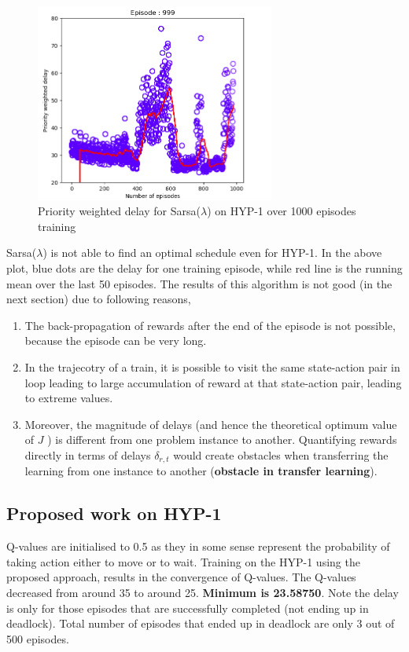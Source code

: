 \begin{figure}[h]
    \centering
    \includegraphics[width=0.7\textwidth]{Sarsa_HYP-1}
    \caption{ Priority weighted delay for Sarsa($\lambda$) on HYP-1 over 1000 episodes training}
    \label{Sarsa_HYP-1}
\end{figure}

Sarsa($\lambda$) is not able to find an optimal schedule even for HYP-1. In the above plot, 
blue dots are the delay for one training episode, while red line is the running mean over the 
last 50 episodes.
The results of this algorithm is not good (in the next section) due to following reasons,
\begin{enumerate}
\item The back-propagation of rewards
      after the end of the episode is not possible, because the episode
can be very long.
\item In the trajecotry of a train, it is possible to visit the same state-action pair in loop leading to 
large accumulation of reward at that state-action pair, leading to extreme values.
\item Moreover, the magnitude of delays (and hence the theoretical
optimum value of $J$ ) is different from one problem instance
to another. Quantifying rewards directly in terms of delays
$\delta_{r,t}$ would create obstacles when transferring the learning from
one instance to another (\textbf{obstacle in transfer learning}).
\end{enumerate}

\subsection{Proposed work on HYP-1}
Q-values are initialised to 0.5 as they in some sense represent the probability of taking action either 
to move or to wait.
Training on the HYP-1 using the proposed approach, results in the convergence of Q-values. The Q-values 
decreased from around 35 to around 25. \textbf{Minimum is 23.58750}. Note the delay is only for those episodes that 
are successfully completed (not ending up in deadlock). Total number of episodes that ended up in deadlock 
are only 3 out of 500 episodes.

